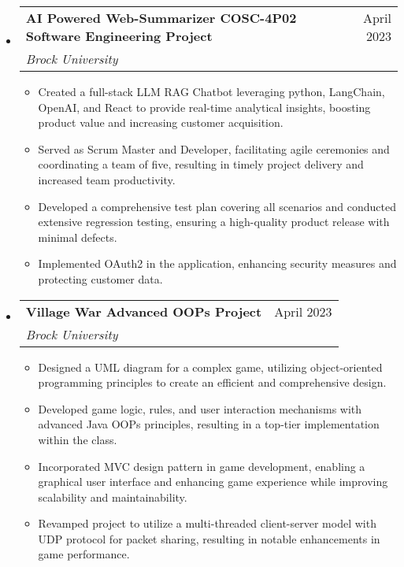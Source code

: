 \documentclass[letterpaper,11pt]{article}
\makeatletter
\newcommand{\resumeItem}[1]{
    \item\small{
            {#1 \vspace{-2pt}}
    }
}
\newcommand{\resumeSubheading}[4]{
    \vspace{-2pt}\item
    \begin{tabular*}{0.97\textwidth}[t]{l@{\extracolsep{\fill}}r}
    \textbf{#1} & #2 \\
    \textit{\small#3} & \textit{\small #4} \\
    \end{tabular*}\vspace{-7pt}
}
\newcommand{\resumeSubHeadingListStart}{\begin{itemize}[leftmargin=0.15in, label={}]}
\newcommand{\resumeSubHeadingListEnd}{\end{itemize}}
\newcommand{\resumeItemListStart}{\begin{itemize}}
\newcommand{\resumeItemListEnd}{\end{itemize}\vspace{-5pt}}
\makeatother
\begin{document}
\begin{center}
\resumeSubHeadingListStart
\resumeSubheading
{AI Powered Web-Summarizer COSC-4P02 Software Engineering Project}{April 2023}
{Brock University}{}
\resumeItemListStart
\resumeItem{Created a full-stack LLM RAG Chatbot leveraging python, LangChain, OpenAI, and React to provide real-time analytical insights, boosting product value and increasing customer acquisition.}
\resumeItem{Served as Scrum Master and Developer, facilitating agile ceremonies and coordinating a team of five, resulting in timely project delivery and increased team productivity.}
\resumeItem{Developed a comprehensive test plan covering all scenarios and conducted extensive regression testing, ensuring a high-quality product release with minimal defects.}
\resumeItem{Implemented OAuth2 in the application, enhancing security measures and protecting customer data.}
\resumeItemListEnd
\resumeSubHeadingListEnd

\resumeSubHeadingListStart
\resumeSubheading
{Village War Advanced OOPs Project}{April 2023}
{Brock University}{}
\resumeItemListStart
\resumeItem{Designed a UML diagram for a complex game, utilizing object-oriented programming principles to create an efficient and comprehensive design.}
\resumeItem{Developed game logic, rules, and user interaction mechanisms with advanced Java OOPs principles, resulting in a top-tier implementation within the class.}
\resumeItem{Incorporated MVC design pattern in game development, enabling a graphical user interface and enhancing game experience while improving scalability and maintainability.}
\resumeItem{Revamped project to utilize a multi-threaded client-server model with UDP protocol for packet sharing, resulting in notable enhancements in game performance.}
\resumeItemListEnd
\resumeSubHeadingListEnd
\end{center}
\end{document}
